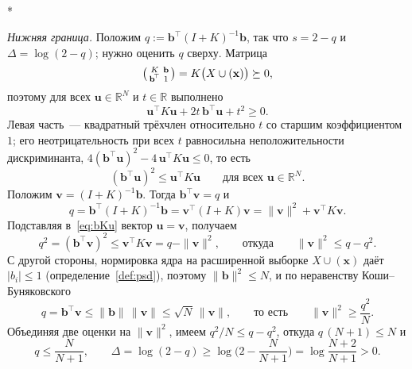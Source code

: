 \documentclass[14pt, a4paper]{extarticle}
\makeatletter
\theoremstyle{definition}
\theoremstyle{plain}
\renewenvironment{proof}[1][\proofname]{\par
    \pushQED{\qed}%
    \normalfont \topsep6\p@\@plus6\p@\relax
    \trivlist
    \item[\hskip\labelsep\itshape #1\@addpunct{.}]\mbox{}\\*
    \ignorespaces
}{\popQED\endtrivlist\@endpefalse}
\makeatother
\begin{document}
\begin{proof}[Доказательство теоремы~\ref{thm:valid}]
\emph{Нижняя граница.} Положим $q:=\mathbf{b}^{\!\top}(I+K)^{-1}\mathbf{b}$, так что
$s=2-q$ и $\Delta=\log(2-q)$; нужно оценить $q$ сверху. Матрица
\[
    \begin{psmallmatrix}K&\mathbf{b}\\ \mathbf{b}^{\!\top}&1\end{psmallmatrix}
    =K\big(X\cup(\mathbf{x})\big)\succeq0 ,
\]
поэтому для всех $\mathbf{u}\in\mathbb{R}^N$ и $t\in\mathbb{R}$ выполнено
\[
    \mathbf{u}^{\!\top}K\mathbf{u}+2t\,\mathbf{b}^{\!\top}\mathbf{u}+t^2\ge0 .
\]
Левая часть~--- квадратный трёхчлен относительно $t$ со старшим коэффициентом $1$;
его неотрицательность при всех $t$ равносильна неположительности дискриминанта,
$4(\mathbf{b}^{\!\top}\mathbf{u})^2-4\,\mathbf{u}^{\!\top}K\mathbf{u}\le0$, то есть
\begin{equation}
    (\mathbf{b}^{\!\top}\mathbf{u})^2\le\mathbf{u}^{\!\top}K\mathbf{u}
    \qquad\text{для всех }\mathbf{u}\in\mathbb{R}^N .
    \label{eq:bKu}
\end{equation}
Положим $\mathbf{v}=(I+K)^{-1}\mathbf{b}$. Тогда $\mathbf{b}^{\!\top}\mathbf{v}=q$ и
\[
    q=\mathbf{b}^{\!\top}(I+K)^{-1}\mathbf{b}
      =\mathbf{v}^{\!\top}(I+K)\mathbf{v}
      =\|\mathbf{v}\|^2+\mathbf{v}^{\!\top}K\mathbf{v} .
\]
Подставляя в~\eqref{eq:bKu} вектор $\mathbf{u}=\mathbf{v}$, получаем
\[
    q^2=(\mathbf{b}^{\!\top}\mathbf{v})^2\le\mathbf{v}^{\!\top}K\mathbf{v}
    =q-\|\mathbf{v}\|^2,
    \qquad\text{откуда}\qquad
    \|\mathbf{v}\|^2\le q-q^2 .
\]
С другой стороны, нормировка ядра на расширенной выборке $X\cup(\mathbf{x})$ даёт
$|b_i|\le1$ (определение~\ref{def:psd}), поэтому $\|\mathbf{b}\|^2\le N$, и по
неравенству Коши--Буняковского
\[
    q=\mathbf{b}^{\!\top}\mathbf{v}\le\|\mathbf{b}\|\,\|\mathbf{v}\|
      \le\sqrt{N}\,\|\mathbf{v}\| ,
    \qquad\text{то есть}\qquad
    \|\mathbf{v}\|^2\ge\frac{q^2}{N} .
\]
Объединяя две оценки на $\|\mathbf{v}\|^2$, имеем $q^2/N\le q-q^2$, откуда
$q\,(N+1)\le N$ и
\[
    q\le\frac{N}{N+1},
    \qquad
    \Delta=\log(2-q)\ge\log\Big(2-\frac{N}{N+1}\Big)=\log\frac{N+2}{N+1}>0 .
\]
\end{proof}
\end{document}

